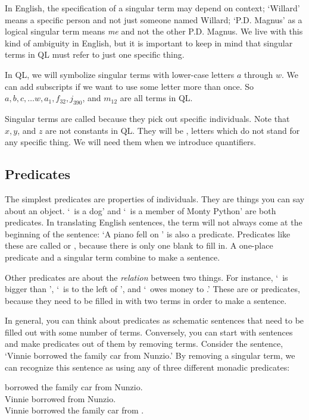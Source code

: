 In English, the specification of a singular term may depend on context; `Willard' means a specific person and not just someone named Willard; `P.D. Magnus' as a logical singular term means \emph{me} and not the other P.D. Magnus. We live with this kind of ambiguity in English, but it is important to keep in mind that singular terms in QL must refer to just one specific thing.

In QL, we will symbolize singular terms with lower-case letters $a$ through $w$. We can add subscripts if we want to use some letter more than once. So $a,b,c,\ldots w, a_1, f_{32}, j_{390}$, and $m_{12}$ are all terms in QL.

Singular terms are called  because they pick out specific individuals. Note that $x, y$, and $z$ are not constants in QL. They will be , letters which do not stand for any specific thing. We will need them when we introduce quantifiers.

\subsection{Predicates}
The simplest predicates are properties of individuals. They are things you can say about an object. `\blank\ is a dog' and `\blank\ is a member of Monty Python' are both predicates. In translating English sentences, the term will not always come at the beginning of the sentence: `A piano fell on \blank' is also a predicate. Predicates like these are called  or , because there is only one blank to fill in. A one-place predicate and a singular term combine to make a sentence.

Other predicates are about the \emph{relation} between two things. For instance, `\blank\ is bigger than \blank', `\blank\ is to the left of \blank', and `\blank\ owes money to \blank.' These are  or  predicates, because they need to be filled in with two terms in order to make a sentence.

In general, you can think about predicates as schematic sentences that need to be filled out with some number of terms. Conversely, you can start with sentences and make predicates out of them by removing terms. Consider the sentence, `Vinnie borrowed the family car from Nunzio.' By removing a singular term, we can recognize this sentence as using any of three different monadic predicates:
\begin{center}
\blank borrowed the family car from Nunzio.\\
Vinnie borrowed \blank from Nunzio.\\
Vinnie borrowed the family car from \blank.
\end{center}

